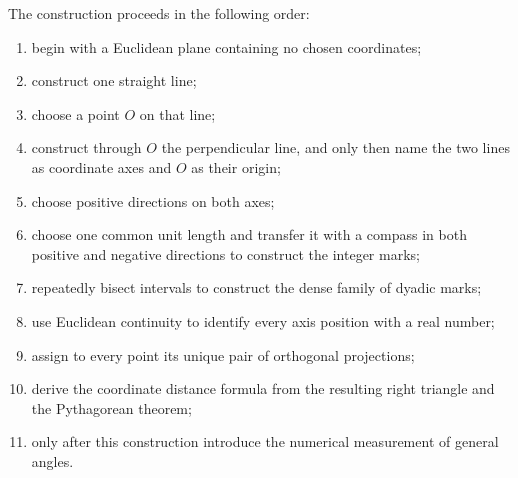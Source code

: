 \begin{summarybox}
The construction proceeds in the following order:
\begin{enumerate}
    \item begin with a Euclidean plane containing no chosen coordinates;
    \item construct one straight line;
    \item choose a point $O$ on that line;
    \item construct through $O$ the perpendicular line, and only then name the
          two lines as coordinate axes and $O$ as their origin;
    \item choose positive directions on both axes;
    \item choose one common unit length and transfer it with a compass in both
          positive and negative directions to construct the integer marks;
    \item repeatedly bisect intervals to construct the dense family of dyadic
          marks;
    \item use Euclidean continuity to identify every axis position with a real
          number;
    \item assign to every point its unique pair of orthogonal projections;
    \item derive the coordinate distance formula from the resulting right
          triangle and the Pythagorean theorem;
    \item only after this construction introduce the numerical measurement of
          general angles.
\end{enumerate}
\end{summarybox}